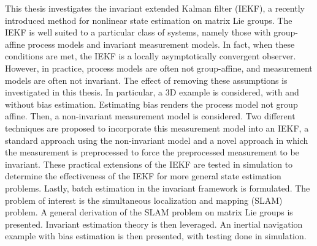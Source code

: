 This thesis investigates the invariant extended Kalman filter (IEKF), a recently introduced method for nonlinear state estimation on matrix Lie groups. The IEKF is well suited to a particular class of systems, namely those with group-affine process models and invariant measurement models. In fact, when these conditions are met, the IEKF is a locally asymptotically convergent observer. However, in practice, process models are often not group-affine, and measurement models are often not invariant. The effect of removing these assumptions is investigated in this thesis. In particular, a 3D example is considered, with and without bias estimation. Estimating bias renders the process model not group affine. Then, a non-invariant measurement model is considered. Two different techniques are proposed to incorporate this measurement model into an IEKF, a standard approach using the non-invariant model and a novel approach in which the measurement is preprocessed to force the preprocessed measurement to be invariant. These practical extensions of the IEKF are tested in simulation to determine the effectiveness of the IEKF for more general state estimation problems. Lastly, batch estimation in the invariant framework is formulated. The problem of interest is the simultaneous localization and mapping (SLAM) problem. A general derivation of the SLAM problem on matrix Lie groups is presented. Invariant estimation theory is then leveraged. An inertial navigation example with bias estimation is then presented, with testing done in simulation. 

\cleardoublepage

